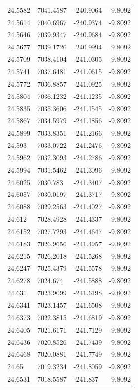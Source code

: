 \begin{table}[H]
\begin{tabular}{llll}
24.5582 & 7041.4587 & -240.9064 & -9.8092 \\
24.5614 & 7040.6967 & -240.9374 & -9.8092 \\
24.5646 & 7039.9347 & -240.9684 & -9.8092 \\
24.5677 & 7039.1726 & -240.9994 & -9.8092 \\
24.5709 & 7038.4104 & -241.0305 & -9.8092 \\
24.5741 & 7037.6481 & -241.0615 & -9.8092 \\
24.5772 & 7036.8857 & -241.0925 & -9.8092 \\
24.5804 & 7036.1232 & -241.1235 & -9.8092 \\
24.5835 & 7035.3606 & -241.1545 & -9.8092 \\
24.5867 & 7034.5979 & -241.1856 & -9.8092 \\
24.5899 & 7033.8351 & -241.2166 & -9.8092 \\
24.593 & 7033.0722 & -241.2476 & -9.8092 \\
24.5962 & 7032.3093 & -241.2786 & -9.8092 \\
24.5994 & 7031.5462 & -241.3096 & -9.8092 \\
24.6025 & 7030.783 & -241.3407 & -9.8092 \\
24.6057 & 7030.0197 & -241.3717 & -9.8092 \\
24.6088 & 7029.2563 & -241.4027 & -9.8092 \\
24.612 & 7028.4928 & -241.4337 & -9.8092 \\
24.6152 & 7027.7293 & -241.4647 & -9.8092 \\
24.6183 & 7026.9656 & -241.4957 & -9.8092 \\
24.6215 & 7026.2018 & -241.5268 & -9.8092 \\
24.6247 & 7025.4379 & -241.5578 & -9.8092 \\
24.6278 & 7024.674 & -241.5888 & -9.8092 \\
24.631 & 7023.9099 & -241.6198 & -9.8092 \\
24.6341 & 7023.1457 & -241.6508 & -9.8092 \\
24.6373 & 7022.3815 & -241.6819 & -9.8092 \\
24.6405 & 7021.6171 & -241.7129 & -9.8092 \\
24.6436 & 7020.8526 & -241.7439 & -9.8092 \\
24.6468 & 7020.0881 & -241.7749 & -9.8092 \\
24.65 & 7019.3234 & -241.8059 & -9.8092 \\
24.6531 & 7018.5587 & -241.837 & -9.8092 \\

\end{tabular}
\end{table}
